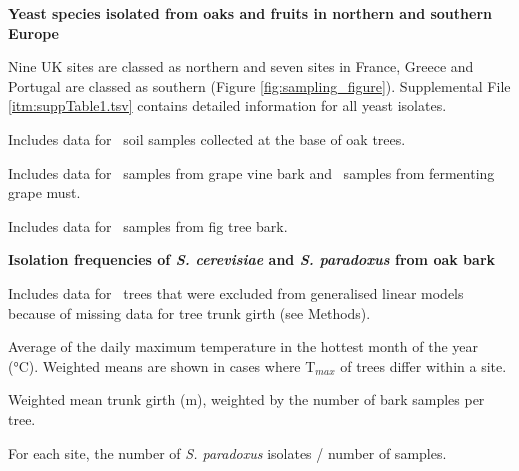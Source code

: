 \documentclass[12pt]{article}
\begin{document}
\begingroup
\renewcommand*{\thefootnote}{\alph{footnote}}
\begin{table}[h!] \centering 
 \begin{threeparttable}
\caption{{\bf Yeast species isolated from oaks and fruits in northern and southern Europe}} 
\label{tab:allsp_table}

   \begin{tablenotes}
      \small
      \item [a] Nine UK sites are classed as northern and seven sites in France, Greece and Portugal are classed as southern (Figure \ref{fig:sampling_figure}). Supplemental File \ref{itm:suppTable1.tsv} contains detailed information for all yeast isolates. 
      \item [b] Includes data for \soil\ soil samples collected at the base of oak trees. 
      \item [c] Includes data for \grapebark\ samples from grape vine bark and \must\ samples from fermenting grape must. 
      \item [d] Includes data for \figbark\ samples from fig tree bark. 
    \end{tablenotes}
 \end{threeparttable}
\end{table}
\endgroup
\clearpage


\begingroup
\renewcommand*{\thefootnote}{\alph{footnote}}
\setcounter{footnote}{0}
\begin{table}[h!] \centering 
 \begin{threeparttable}
\caption{{\bf Isolation frequencies of \textit{S. cerevisiae} and \textit{S. paradoxus} from oak bark}} 
      \label{tab:scsp_table}

    \begin{tablenotes}
      \small
      \item [a] Includes data for \missingcircum\ trees that were excluded from generalised linear models because of missing data for tree trunk girth (see Methods). 
      \item [b] Average of the daily maximum temperature in the hottest month of the year (\si{\degreeCelsius}). Weighted means are shown in cases where T$_{max}$ of trees differ within a site. 
      \item [c] Weighted mean trunk girth (m), weighted by the number of bark samples per tree. 
      \item [d] For each site, the number of \textit{S. paradoxus} isolates / number of samples.
    \end{tablenotes}
 \end{threeparttable}
\end{table}
\clearpage
\end{document}
